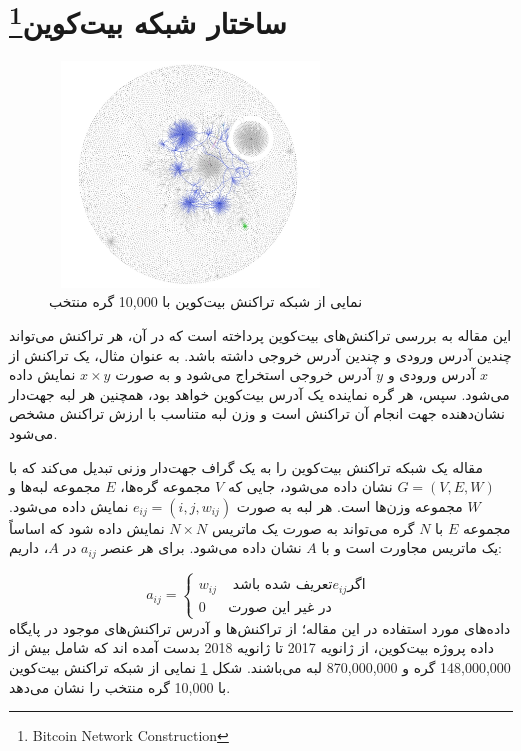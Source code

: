 \pagebreak

~\section{ساختار شبکه بیت‌کوین\footnote{ Bitcoin Network Construction }}
\begin{figure}[t]
\centering
\includegraphics[height=6cm,width=7.5cm]{BTC_VISUAL.jpg}
\caption{نمایی از شبکه تراکنش بیت‌کوین با 10,000 گره منتخب \cite{r0}}
\label{btcv}
\centering
\end{figure}
این مقاله به بررسی تراکنش‌های بیت‌کوین پرداخته است که در آن، هر تراکنش می‌تواند چندین آدرس ورودی و چندین آدرس خروجی داشته باشد. به عنوان مثال، یک تراکنش از $x$ آدرس ورودی و $y$ آدرس خروجی استخراج می‌شود و به صورت $x \times y$ نمایش داده می‌شود. سپس، هر گره نماینده یک آدرس بیت‌کوین خواهد بود، همچنین هر لبه جهت‌دار نشان‌دهنده جهت انجام آن تراکنش است و وزن لبه متناسب با ارزش تراکنش مشخص می‌شود.

مقاله یک شبکه تراکنش بیت‌کوین را به یک گراف جهت‌دار وزنی تبدیل می‌کند که با \mbox{$G = (V, E, W)$} نشان داده می‌شود، جایی که $V$ مجموعه گره‌ها، $E$ مجموعه لبه‌ها و $W$ مجموعه وزن‌ها است. هر لبه به صورت $e_{ij} = (i, j, w_{ij})$ نمایش داده می‌شود. مجموعه $E$ با $N$ گره می‌تواند به صورت یک ماتریس $N \times N$ نمایش داده شود که اساساً یک ماتریس مجاورت است و با $A$ نشان داده می‌شود. برای هر عنصر $a_{ij}$ در $A$، داریم:

\[
a_{ij} = 
\begin{cases} 
w_{ij} & \text{ تعریف شده باشد} e_{ij} \text{اگر }  \\ 
0 & \text{در غیر این صورت} 
\end{cases}
\]
\newpage
داده‌های مورد استفاده در این مقاله؛ از تراکنش‌ها و آدرس تراکنش‌های موجود در پایگاه داده پروژه بیت‌کوین، از ژانویه 2017 تا ژانویه 2018 بدست آمده اند که شامل بیش از 148,000,000 گره و 870,000,000 لبه می‌باشند. شکل \ref{btcv} نمایی از شبکه تراکنش بیت‌کوین با 10,000 گره منتخب را نشان می‌دهد.

